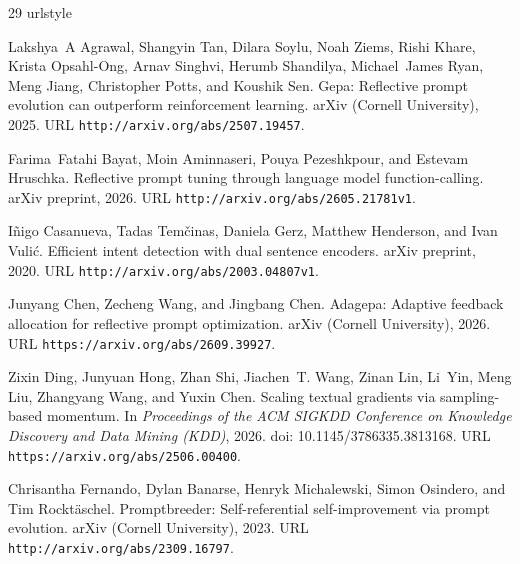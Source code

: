 \documentclass[10pt]{article}
\begin{document}
  \begin{thebibliography}{29}
\providecommand{\natexlab}[1]{#1}
\providecommand{\url}[1]{\texttt{#1}}
\expandafter\ifx\csname urlstyle\endcsname\relax
  \providecommand{\doi}[1]{doi: #1}\else
  \providecommand{\doi}{doi: \begingroup \urlstyle{rm}\Url}\fi

Lakshya~A Agrawal, Shangyin Tan, Dilara Soylu, Noah Ziems, Rishi Khare, Krista
  Opsahl-Ong, Arnav Singhvi, Herumb Shandilya, Michael~James Ryan, Meng Jiang,
  Christopher Potts, and Koushik Sen.
\newblock Gepa: Reflective prompt evolution can outperform reinforcement
  learning.
\newblock arXiv (Cornell University), 2025.
\newblock URL \url{http://arxiv.org/abs/2507.19457}.

Farima~Fatahi Bayat, Moin Aminnaseri, Pouya Pezeshkpour, and Estevam Hruschka.
\newblock Reflective prompt tuning through language model function-calling.
\newblock arXiv preprint, 2026.
\newblock URL \url{http://arxiv.org/abs/2605.21781v1}.

I\~{n}igo Casanueva, Tadas Tem\v{c}inas, Daniela Gerz, Matthew Henderson, and Ivan
  Vuli\'{c}.
\newblock Efficient intent detection with dual sentence encoders.
\newblock arXiv preprint, 2020.
\newblock URL \url{http://arxiv.org/abs/2003.04807v1}.

Junyang Chen, Zecheng Wang, and Jingbang Chen.
\newblock Adagepa: Adaptive feedback allocation for reflective prompt
  optimization.
\newblock arXiv (Cornell University), 2026.
\newblock URL \url{https://arxiv.org/abs/2609.39927}.

Zixin Ding, Junyuan Hong, Zhan Shi, Jiachen~T. Wang, Zinan Lin, Li~Yin, Meng
  Liu, Zhangyang Wang, and Yuxin Chen.
\newblock Scaling textual gradients via sampling-based momentum.
\newblock In \emph{Proceedings of the ACM SIGKDD Conference on Knowledge
  Discovery and Data Mining (KDD)}, 2026.
\newblock \doi{10.1145/3786335.3813168}.
\newblock URL \url{https://arxiv.org/abs/2506.00400}.

Chrisantha Fernando, Dylan Banarse, Henryk Michalewski, Simon Osindero, and Tim
  Rockt\"{a}schel.
\newblock Promptbreeder: Self-referential self-improvement via prompt
  evolution.
\newblock arXiv (Cornell University), 2023.
\newblock URL \url{http://arxiv.org/abs/2309.16797}.


\end{thebibliography}
\end{document}
